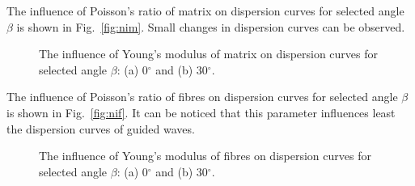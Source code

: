 The influence of  Poisson's ratio of matrix on dispersion curves for selected angle 
\(\beta\) is shown in Fig.~\ref{fig:nim}. Small changes in dispersion curves can be 
observed.


\begin{figure} [h!]
	\centering
	\begin{subfigure}[b]{0.49\textwidth}
		\centering
		

		\caption{}
		\label{fig:em0}
	\end{subfigure}
	\hfill
	\begin{subfigure}[b]{0.49\textwidth}
		\centering
		
		
		\caption{}
		\label{fig:em30}
	\end{subfigure}





















	
\caption{The influence of Young's modulus of matrix  on dispersion curves for 
	selected angle \(\beta\): (a) 0\(^{\circ}\) and (b) 30\(^{\circ}\).}
 
	\label{fig:em}
\end{figure}

The influence of Poisson's ratio of fibres  on dispersion curves for selected angle 
\(\beta\) is shown in Fig.~\ref{fig:nif}. It can be noticed that this parameter influences 
least the dispersion curves of guided waves.


\begin{figure} [h!]
	\centering
	\begin{subfigure}[b]{0.49\textwidth}
		\centering
		

		\caption{}
		\label{fig:ef0}
	\end{subfigure}
	\hfill
	\begin{subfigure}[b]{0.49\textwidth}
		\centering
		
		

		\caption{}
		\label{fig:ef30}
	\end{subfigure}





















		
\caption{The influence of Young's modulus of fibres on dispersion curves for 
		selected angle \(\beta\): (a) 0\(^{\circ}\) and (b) 30\(^{\circ}\).}
 
	\label{fig:ef}
\end{figure}

